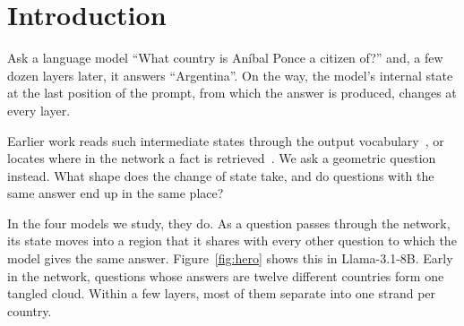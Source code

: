 \section{Introduction}
\label{sec:intro}

Ask a language model ``What country is An\'{i}bal Ponce a citizen of?'' and, a few dozen layers later, it answers ``Argentina''. On the way, the model's internal state at the last position of the prompt, from which the answer is produced, changes at every layer.

Earlier work reads such intermediate states through the output vocabulary~\citep{nostalgebraist2020interpreting,belrose2023eliciting}, or locates where in the network a fact is retrieved~\citep{geva2023dissecting,meng2022locating}. We ask a geometric question instead. What shape does the change of state take, and do questions with the same answer end up in the same place?

In the four models we study, they do. As a question passes through the network, its state moves into a region that it shares with every other question to which the model gives the same answer. Figure~\ref{fig:hero} shows this in Llama-3.1-8B. Early in the network, questions whose answers are twelve different countries form one tangled cloud. Within a few layers, most of them separate into one strand per country.

